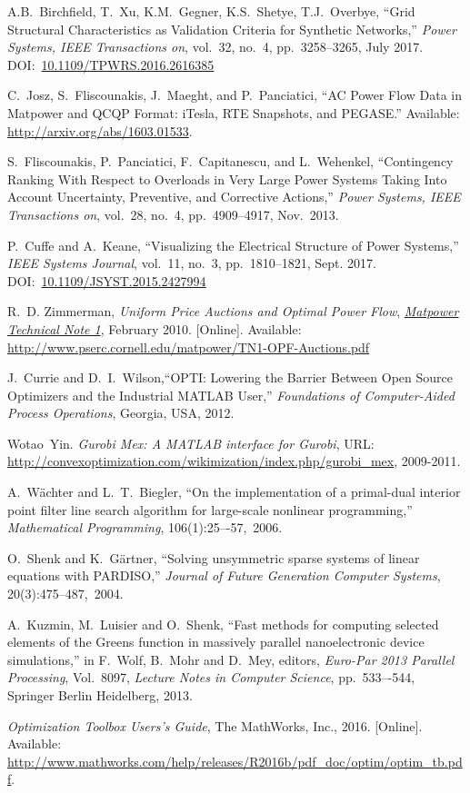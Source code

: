 \documentclass[12pt]{article}
\newcommand{\matpower}[0]{{\sc Matpower}}
\newcommand{\TNoneurl}[0]{http://www.pserc.cornell.edu/matpower/TN1-OPF-Auctions.pdf}
\newcommand{\TNone}[0]{\href{\TNoneurl}{\it \matpower{} Technical Note 1}}
\numberwithin{equation}{section}
\numberwithin{table}{section}
\numberwithin{figure}{section}
\begin{document}
\begin{thebibliography}{99}
A.B.~Birchfield, T.~Xu, K.M.~Gegner, K.S.~Shetye, T.J.~Overbye,
``Grid Structural Characteristics as Validation Criteria for Synthetic Networks,''  \emph{Power Systems, IEEE Transactions on}, vol.~32, no.~4, pp.~3258--3265, July 2017.
DOI:~\href{https://doi.org/10.1109/TPWRS.2016.2616385}{10.1109/TPWRS.2016.2616385}

C.~Josz, S.~Fliscounakis, J.~Maeght, and P.~Panciatici, ``AC Power
Flow Data in \matpower{} and QCQP Format: iTesla, RTE Snapshots, and PEGASE.''
Available: \url{http://arxiv.org/abs/1603.01533}.

S.~Fliscounakis, P.~Panciatici, F.~Capitanescu, and L.~Wehenkel, ``Contingency Ranking With Respect to Overloads in Very Large Power Systems Taking Into Account Uncertainty, Preventive, and Corrective Actions,'' \emph{Power Systems, IEEE Transactions on}, vol.~28, no.~4, pp.~4909--4917, Nov.~2013.

P.~Cuffe and A.~Keane, ``Visualizing the Electrical Structure of Power Systems,'' \emph{IEEE Systems Journal}, vol.~11, no.~3, pp.~1810--1821, Sept. 2017.
DOI:~\href{https://doi.org/10.1109/JSYST.2015.2427994}{10.1109/JSYST.2015.2427994}

R.~D. Zimmerman, \emph{Uniform Price Auctions and Optimal Power Flow}, \TNone, February 2010. [Online]. Available: \url{\TNoneurl}

J.~Currie and D.~I.~Wilson,``OPTI: Lowering the Barrier Between Open Source Optimizers and the Industrial MATLAB User,'' \emph{Foundations of Computer-Aided Process Operations}, Georgia, USA, 2012.

Wotao~Yin. \emph{Gurobi Mex: A MATLAB interface for Gurobi}, URL: \url{http://convexoptimization.com/wikimization/index.php/gurobi_mex}, 2009-2011.

A.~W\"achter and L.~T.~Biegler, ``On the implementation of a primal-dual interior point filter line search algorithm for large-scale nonlinear programming,'' \emph{Mathematical Programming}, 106(1):25–-57,~2006.

O.~Shenk and K.~G\"artner, ``Solving unsymmetric sparse systems of linear equations with PARDISO,'' \emph{Journal of Future Generation Computer Systems}, 20(3):475--487,~2004.

A.~Kuzmin, M.~Luisier and O.~Shenk, ``Fast methods for computing selected elements of the Greens function in massively parallel nanoelectronic device simulations,'' in F.~Wolf, B.~Mohr and D.~Mey, editors, \emph{Euro-Par 2013 Parallel Processing}, Vol.~8097, \emph{Lecture Notes in Computer Science}, pp.~533–-544, Springer Berlin Heidelberg, 2013.

\emph{Optimization Toolbox Users's Guide}, The MathWorks, Inc., 2016.
  [Online]. Available: \url{http://www.mathworks.com/help/releases/R2016b/pdf_doc/optim/optim_tb.pdf}.

\end{thebibliography}
\end{document}
